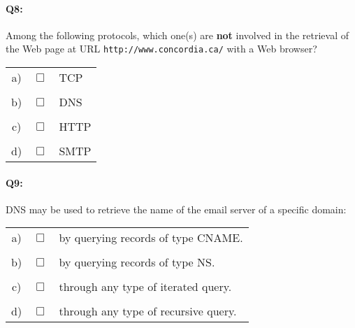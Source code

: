 \documentclass{llncs}
\newcommand{\answer}[1]{}%
\begin{document}
\answer{See slides 29-30 in Chapter 2.}

\paragraph{\textbf{Q8:}} Among the following protocols, which one(s) are \textbf{not} involved in the retrieval of the Web page at URL \texttt{http://www.concordia.ca/} with a Web browser?\\

\begin{tabular}{ccl}
  a) & $\Box$ & TCP\\
  \\
  b) & $\Box$ & DNS\\
  \\
  c) & $\Box$ & HTTP\\
  \\
  d) & $\Box$ & SMTP\\
\end{tabular}

\answer{Before the communication can be initiated, the IP address of
  \texttt{www.concordia.ca} has to be looked up, which is done using
  DNS. The connection is then established using TCP. Finally, the
  webpage is requested using HTTP. SMTP is an email protocol which has
  nothing to do with the Web.}

\paragraph{\textbf{Q9:}} DNS may be used to retrieve the name of the email server of a specific domain:\\

\begin{tabular}{ccl}
  a) & $\Box$ & by querying records of type CNAME.\\
  \\
  b) & $\Box$ & by querying records of type NS.\\
  \\
  c) & $\Box$ & through any type of iterated query.\\
  \\
  d) & $\Box$ & through any type of recursive query.\\
\end{tabular}

\answer{None of the options are correct. a) CNAME records associate
  names with canonical names, they are used to lookup aliases. b) NS
  records associate domain names with host names, they are used to
  lookup name servers. c) and d) Iterated or recursive queries can be
  used for any type of query but they don't preclude any particular
  record type. Email servers can be retrieved by querying for MX
  records. See slide 66 in Chapter 2.}
\end{document}
